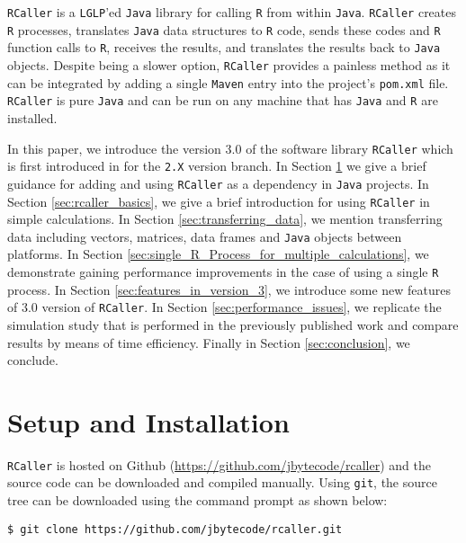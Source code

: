 \documentclass[10pt,a4paper, final, oneside]{article}
\begin{document}
\texttt{RCaller} \cite{satman2014rcaller} is a \texttt{LGLP}'ed \texttt{Java} library for calling \texttt{R} from within \texttt{Java}. \texttt{RCaller} creates \texttt{R} processes, translates \texttt{Java} data structures to \texttt{R} code, sends these codes and \texttt{R} function calls to \texttt{R}, receives the results, and translates the results back to \texttt{Java} objects. Despite being a slower option, \texttt{RCaller} provides a painless method as it can be integrated by adding a single \texttt{Maven} entry into the project's \texttt{pom.xml} file. \texttt{RCaller} is pure \texttt{Java} and can be run on any machine that has \texttt{Java} and \texttt{R} are installed. 

In this paper, we introduce the version $3.0$ of the software library \texttt{RCaller} which is first introduced in \cite{satman2014rcaller} for the \texttt{2.X} version branch. In Section \ref{sec:setup} we give a brief guidance for adding and using \texttt{RCaller} as a dependency in \texttt{Java} projects. In Section \ref{sec:rcaller_basics}, we give a brief introduction for using \texttt{RCaller} in simple calculations. In Section \ref{sec:transferring_data}, we mention transferring data including vectors, matrices, data frames and \texttt{Java} objects between platforms. In Section \ref{sec:single_R_Process_for_multiple_calculations}, we demonstrate gaining performance improvements in the case of using a single \texttt{R} process. In Section \ref{sec:features_in_version_3}, we introduce some new features of $3.0$ version of \texttt{RCaller}. In Section \ref{sec:performance_issues}, we replicate the simulation study that is performed in the previously published work and compare results by means of time efficiency. Finally in Section \ref{sec:conclusion}, we conclude.

\section{Setup and Installation}
\label{sec:setup}

\texttt{RCaller} is hosted on Github (\url{https://github.com/jbytecode/rcaller}) and the source code can be downloaded and compiled manually. Using \texttt{git}, the source tree can be downloaded using the command prompt as shown below:


\begin{minipage}{\linewidth}
\begin{lstlisting}[caption=Downloading source code, label=code:git]
$ git clone https://github.com/jbytecode/rcaller.git
\end{lstlisting}
\end{minipage}
\end{document}
